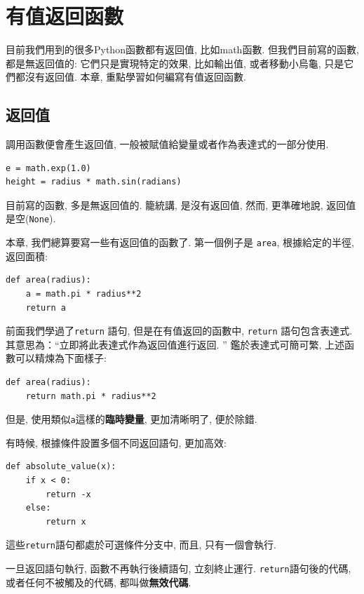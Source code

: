\documentclass[10pt]{book}
\begin{document}
\chapter{有值返回函數}
\label{fruitchap}

目前我們用到的很多Python函數都有返回值, 比如math函數. 
但我們目前寫的函數, 都是無返回值的: 它們只是實現特定的效果, 比如輸出值, 
或者移動小烏龜, 只是它們都沒有返回值. 
本章, 重點學習如何編寫有值返回函數. 

\section{返回值}

調用函數便會產生返回值, 一般被賦值給變量或者作為表達式的一部分使用. 

\begin{verbatim}
e = math.exp(1.0)
height = radius * math.sin(radians)
\end{verbatim}
%
目前寫的函數, 多是無返回值的. 籠統講, 是沒有返回值, 然而, 
更準確地說, 返回值是空({\tt None}).

本章, 我們總算要寫一些有返回值的函數了. 
第一個例子是 {\tt area}, 根據給定的半徑, 返回面積:

\begin{verbatim}
def area(radius):
    a = math.pi * radius**2
    return a
\end{verbatim}
%
前面我們學過了{\tt return} 語句, 但是在有值返回的函數中, 
{\tt return} 語句包含表達式. 
其意思為：``立即將此表達式作為返回值進行返回. ''
鑑於表達式可簡可繁, 上述函數可以精煉為下面樣子:

\begin{verbatim}
def area(radius):
    return math.pi * radius**2
\end{verbatim}
%
但是, 使用類似{\tt a}這樣的{\bf 臨時變量}, 更加清晰明了, 便於除錯. 

有時候, 根據條件設置多個不同返回語句, 更加高效:

\begin{verbatim}
def absolute_value(x):
    if x < 0:
        return -x
    else:
        return x
\end{verbatim}
%
這些{\tt return}語句都處於可選條件分支中, 而且, 只有一個會執行. 

一旦返回語句執行, 函數不再執行後續語句, 立刻終止運行. 
{\tt return}語句後的代碼, 或者任何不被觸及的代碼, 都叫做{\bf 無效代碼}.
\end{document}
